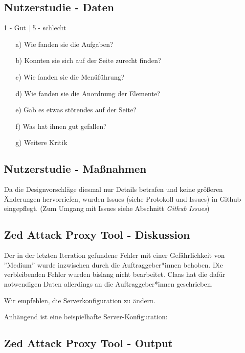 \documentclass[accentcolor=tud0b,12pt,paper=a4]{tudreport}
\begin{document}
	\subsection*{Nutzerstudie - Daten}
	\begin{adjustbox}{max width=\textwidth}
	\end{adjustbox}
	\begin{footnotesize} 1 - Gut | 5 - schlecht \end{footnotesize}
	\begin{itemize}
		\item[a)] Wie fanden sie die Aufgaben?
		\item[b)] Konnten sie sich auf der Seite zurecht finden?
		\item[c)] Wie fanden sie die Menüführung?
		\item[d)] Wie fanden sie die Anordnung der Elemente?
		\item[e)] Gab es etwas störendes auf der Seite?
		\item[f)] Was hat ihnen gut gefallen?
		\item[g)] Weitere Kritik
	\end{itemize}

	\subsection*{Nutzerstudie - Maßnahmen}
	Da die Designvorschläge diesmal nur Details betrafen und keine größeren Änderungen hervorriefen, wurden Issues (siehe Protokoll und Issues) in Github eingepflegt. (Zum Umgang mit Issues siehe Abschnitt \emph{Github Issues})

	\subsection*{Zed Attack Proxy Tool - Diskussion}
	Der in der letzten Iteration gefundene Fehler mit einer Gefährlichkeit von ''Medium'' wurde inzwischen durch die Auftraggeber*innen behoben. Die verbleibenden Fehler wurden bislang nicht bearbeitet. Claas hat die dafür notwendigen Daten allerdings an die Auftraggeber*innen geschrieben.

	Wir empfehlen, die Serverkonfiguration zu ändern.

	Anhängend ist eine beispielhafte Server-Konfiguration:

	

	\subsection*{Zed Attack Proxy Tool - Output}
	
\end{document}
